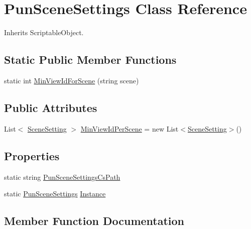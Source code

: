 \hypertarget{class_pun_scene_settings}{}\section{Pun\+Scene\+Settings Class Reference}
\label{class_pun_scene_settings}


Inherits Scriptable\+Object.

\subsection*{Static Public Member Functions}
\begin{DoxyCompactItemize}
\item 
static int \hyperlink{class_pun_scene_settings_aa5344480f6e9b7ce76a2e9c235f630ed}{Min\+View\+Id\+For\+Scene} (string scene)
\end{DoxyCompactItemize}
\subsection*{Public Attributes}
\begin{DoxyCompactItemize}
\item 
List$<$ \hyperlink{class_scene_setting}{Scene\+Setting} $>$ \hyperlink{class_pun_scene_settings_a827df7e0b56751a37d18179786954462}{Min\+View\+Id\+Per\+Scene} = new List$<$\hyperlink{class_scene_setting}{Scene\+Setting}$>$()
\end{DoxyCompactItemize}
\subsection*{Properties}
\begin{DoxyCompactItemize}
\item 
static string \hyperlink{class_pun_scene_settings_a96a96fc88a6e8b6919d04f833b7e0cb3}{Pun\+Scene\+Settings\+Cs\+Path}
\item 
static \hyperlink{class_pun_scene_settings}{Pun\+Scene\+Settings} \hyperlink{class_pun_scene_settings_a50bf111c9a9fd6daa6c4ab9082004932}{Instance}
\end{DoxyCompactItemize}


\subsection{Member Function Documentation}
